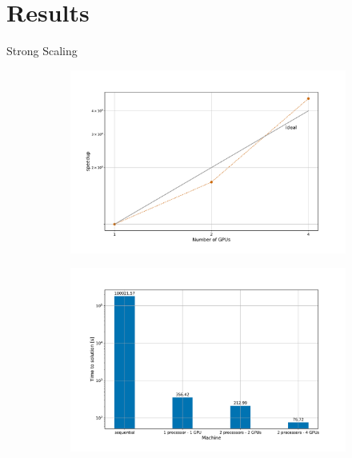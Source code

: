 \documentclass[10pt]{beamer}
\begin{document}

\section{Results}

\begin{frame}{Strong Scaling}
	
	\begin{figure}
		\begin{subfigure}{.6\textwidth}
			\centering
			\hspace{-2cm}
			\includegraphics[width=.98\linewidth, clip, trim={1.5cm 1cm 2.5cm 2cm}]{strong-mpi.pdf}
			\caption{} 
			\label{fig:strong-mpi}
		\end{subfigure}%
		\begin{subfigure}{.6\textwidth}
			\centering
			\hspace{-2.5cm}
			\includegraphics[width=.98\linewidth, clip, trim={1.5cm 1cm 2.5cm 2cm}]{strong-tts.pdf}

\end{subfigure}
\end{figure}
\end{frame}
\end{document}
